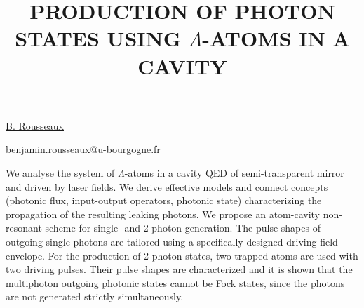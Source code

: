 \title{PRODUCTION OF PHOTON STATES USING $\Lambda$-ATOMS IN A CAVITY}

\underline{B. Rousseaux} 

{\normalsize{\vspace{-4mm}
\dijon

\email benjamin.rousseaux@u-bourgogne.fr}}

We analyse the system of $\Lambda$-atoms in a cavity QED of semi-transparent mirror and driven by laser fields. We derive effective models and connect concepts (photonic flux, input-output operators, photonic state) characterizing the propagation of the resulting leaking photons. We propose an atom-cavity non-resonant scheme for single- and 2-photon generation. The pulse shapes of outgoing single photons are tailored using a specifically designed driving field envelope. For the production of 2-photon states, two trapped atoms are used with two driving pulses. Their pulse shapes are characterized and it is shown that the multiphoton outgoing photonic states cannot be Fock states, since the photons are not generated strictly simultaneously.

\vspace{\baselineskip}
